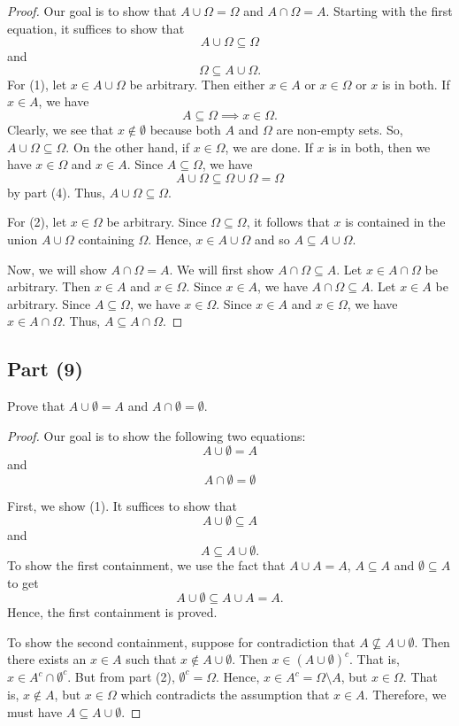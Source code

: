 \documentclass[a4paper]{article}
\begin{document}
\begin{proof}
Our goal is to show that \( A \cup \Omega = \Omega \) and \( A \cap \Omega = A  \). Starting with the first equation, it suffices to show that 
\[  A \cup \Omega \subseteq \Omega \tag{1} \]
and
\[  \Omega \subseteq A \cup \Omega. \tag{2} \]
For (1), let \( x \in A \cup \Omega \) be arbitrary. Then either \( x \in A  \) or \( x \in \Omega \) or \( x  \) is in both. If \( x \in A  \), we have
\[  A \subseteq \Omega \implies x \in \Omega. \]
Clearly, we see that \( x \not\in \emptyset  \) because both \( A  \) and \( \Omega \) are non-empty sets. 
So, \( A \cup \Omega \subseteq \Omega \). On the other hand, if \( x \in \Omega \), we are done. If \( x  \) is in both, then we have \( x \in \Omega \) and \( x \in A  \). Since \( A \subseteq \Omega \), we have 
\[  A \cup \Omega \subseteq \Omega \cup \Omega = \Omega  \]
by part (4). Thus, \( A \cup \Omega \subseteq  \Omega \). 

For (2), let \( x \in \Omega \) be arbitrary. Since \( \Omega \subseteq \Omega \), it follows that \( x  \) is contained in the union \( A \cup \Omega \) containing \( \Omega \). Hence, \( x \in A \cup \Omega \) and so \( A \subseteq A \cup \Omega \).

Now, we will show \( A \cap \Omega = A  \). We will first show \( A \cap \Omega \subseteq  A  \). Let \( x \in A \cap \Omega \) be arbitrary. Then \( x \in A  \) and \( x \in \Omega \). Since \( x \in A  \), we have \( A \cap \Omega \subseteq  A  \). Let \( x \in A  \) be arbitrary. Since \( A \subseteq  \Omega \), we have \( x \in \Omega \). Since \( x \in A  \) and \( x \in \Omega \), we have \( x \in A \cap \Omega \). Thus, \( A \subseteq  A \cap \Omega \). 
\end{proof}

\subsection*{Part (9)}
Prove that \( A \cup \emptyset = A  \) and \( A \cap \emptyset = \emptyset \).
\begin{proof}
Our goal is to show the following two equations:
\[  A \cup \emptyset = A \tag{1} \]
and 
\[  A \cap \emptyset = \emptyset \tag{2}  \]

First, we show (1). It suffices to show that \[ A \cup \emptyset \subseteq A \tag{*}   \]  
and 
\[ A \subseteq  A \cup \emptyset. \tag{**} \] To show the first containment, we use the fact that \( A \cup A = A  \), \( A \subseteq  A  \) and \( \emptyset \subseteq A  \) to get  
\[  A \cup \emptyset \subseteq  A \cup A  = A.  \]
Hence, the first containment is proved.

To show the second containment, suppose for contradiction that \( A \not\subseteq A \cup \emptyset \). Then there exists an \( x \in A  \) such that \( x \not\in A \cup \emptyset \). Then \( x \in (A \cup \emptyset)^{c} \). That is, \( x \in A^{c} \cap \emptyset^{c} \). But from part (2), \( \emptyset^{c} = \Omega \). Hence, \( x \in A^{c} = \Omega \setminus  A  \), but \( x \in \Omega \). That is, \( x \notin A  \), but \( x \in \Omega \) which contradicts the assumption that \( x \in A  \). Therefore, we must have \( A  \subseteq  A \cup \emptyset  \).  

\end{proof}
\end{document}
